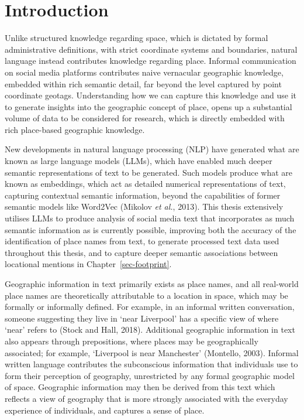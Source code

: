 \documentclass[
  letterpaper,
  11pt,
  english,
  onehalfspacing,
  headsepline]{MastersDoctoralThesis}
\begin{document}
\hypertarget{introduction}{%
\section{Introduction}\label{introduction}}

Unlike structured knowledge regarding space, which is dictated by formal
administrative definitions, with strict coordinate systems and
boundaries, natural language instead contributes knowledge regarding
place. Informal communication on social media platforms contributes
naive vernacular geographic knowledge, embedded within rich semantic
detail, far beyond the level captured by point coordinate geotags.
Understanding how we can capture this knowledge and use it to generate
insights into the geographic concept of place, opens up a substantial
volume of data to be considered for research, which is directly embedded
with rich place-based geographic knowledge.

New developments in natural language processing (NLP) have generated
what are known as large language models (LLMs), which have enabled much
deeper semantic representations of text to be generated. Such models
produce what are known as embeddings, which act as detailed numerical
representations of text, capturing contextual semantic information,
beyond the capabilities of former semantic models like Word2Vec (Mikolov
\emph{et al.}, 2013). This thesis extensively utilises LLMs to produce
analysis of social media text that incorporates as much semantic
information as is currently possible, improving both the accuracy of the
identification of place names from text, to generate processed text data
used throughout this thesis, and to capture deeper semantic associations
between locational mentions in Chapter~\ref{sec-footprint}.

Geographic information in text primarily exists as place names, and all
real-world place names are theoretically attributable to a location in
space, which may be formally or informally defined. For example, in an
informal written conversation, someone suggesting they live in `near
Liverpool' has a specific view of where `near' refers to (Stock and
Hall, 2018). Additional geographic information in text also appears
through prepositions, where places may be geographically associated; for
example, `Liverpool is near Manchester' (Montello, 2003). Informal
written language contributes the subconscious information that
individuals use to form their perception of geography, unrestricted by
any formal geographic model of space. Geographic information may then be
derived from this text which reflects a view of geography that is more
strongly associated with the everyday experience of individuals, and
captures a sense of place.
\end{document}
